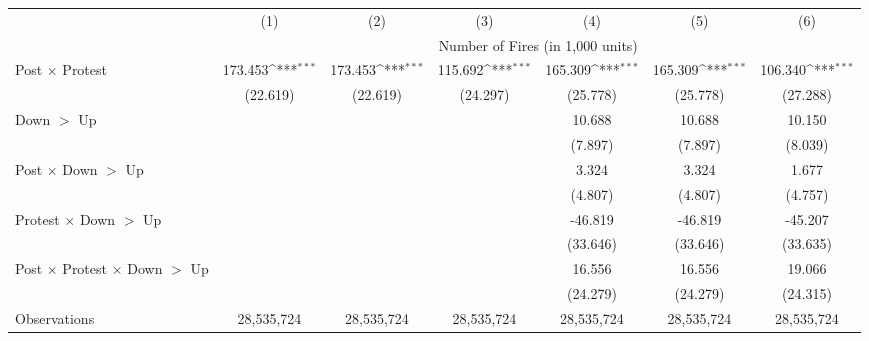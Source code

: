 {
\def\sym#1{\ifmmode^{#1}\else\(^{#1}\)\fi}
\begin{tabular}{l*{6}{c}}
\hline
            &\multicolumn{1}{c}{(1)}         &\multicolumn{1}{c}{(2)}         &\multicolumn{1}{c}{(3)}         &\multicolumn{1}{c}{(4)}         &\multicolumn{1}{c}{(5)}         &\multicolumn{1}{c}{(6)}         \\
            & \multicolumn{6}{c}{Number of Fires (in 1,000 units)} \\ \hline

Post $\times$ Protest&     173.453\sym{***}&     173.453\sym{***}&     115.692\sym{***}&     165.309\sym{***}&     165.309\sym{***}&     106.340\sym{***}\\
            &    (22.619)         &    (22.619)         &    (24.297)         &    (25.778)         &    (25.778)         &    (27.288)         \\
Down $>$ Up &                     &                     &                     &      10.688         &      10.688         &      10.150         \\
            &                     &                     &                     &     (7.897)         &     (7.897)         &     (8.039)         \\
Post $\times$ Down $>$ Up&                     &                     &                     &       3.324         &       3.324         &       1.677         \\
            &                     &                     &                     &     (4.807)         &     (4.807)         &     (4.757)         \\
Protest $\times$ Down $>$ Up&                     &                     &                     &     -46.819         &     -46.819         &     -45.207         \\
            &                     &                     &                     &    (33.646)         &    (33.646)         &    (33.635)         \\
Post $\times$ Protest $\times$ Down $>$ Up&                     &                     &                     &      16.556         &      16.556         &      19.066         \\
            &                     &                     &                     &    (24.279)         &    (24.279)         &    (24.315)         \\
\hline
Observations&  28,535,724         &  28,535,724         &  28,535,724         &  28,535,724         &  28,535,724         &  28,535,724         \\

\end{tabular}}
